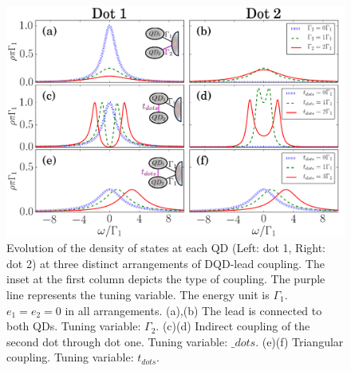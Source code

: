     \begin{figure}[t]
        \centering
         \includegraphics[scale=0.47]{IMAGES/DQD/Non-interacting.png}
         \caption{\label{fig:GreenDQD} Evolution of the density of states at each QD (Left: dot 1, Right: dot 2) at three distinct arrangements of DQD-lead coupling. The inset at the first column depicts the type of coupling. The purple line represents the tuning variable. The energy unit is $\Gamma_1$. $e_1 =e_2 =0$ in all arrangements. (a),(b) The lead is connected to both QDs. Tuning variable: $\Gamma_2$. (c)(d) Indirect coupling of the second dot through dot one. Tuning variable: $\_{dots}$. (e)(f) Triangular coupling. Tuning variable: $t_{dots}$.  
         \protect{}}
    \end{figure}



